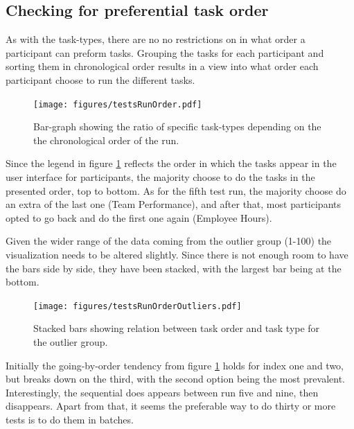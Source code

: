 \documentclass[nofilelist,dvipsnames]{cslthse-msc}
\begin{document}
{      \subsection{Checking for preferential task order}

        As with the task-types, there are no no restrictions on in what order a
        participant can preform tasks. Grouping the tasks for each participant
        and sorting them in chronological order results in a view into what
        order each participant choose to run the different tasks.

				\begin{figure}[ht!]
					\centering
					\texttt{[image: figures/testsRunOrder.pdf]}
          \caption{
            Bar-graph showing the ratio of specific task-types depending on the
            the chronological order of the run.
          }
          \label{label_testsRunOrder}
        \end{figure}

        Since the legend in figure \ref{label_testsRunOrder} reflects the order
        in which the tasks appear in the user interface for participants, the
        majority choose to do the tasks in the presented order, top to bottom.
        As for the fifth test run, the majority choose do an extra of the last
        one (Team Performance), and after that, most participants opted to go
        back and do the first one again (Employee Hours).

        Given the wider range of the data coming from the outlier group (1-100)
        the visualization needs to be altered slightly. Since there is not
        enough room to have the bars side by side, they have been stacked, with
        the largest bar being at the bottom.
				\begin{figure}[ht!]
					\centering
					\texttt{[image: figures/testsRunOrderOutliers.pdf]}
          \caption{
            Stacked bars showing relation between task order and task type for
            the outlier group.
          }
				\end{figure}

        Initially the going-by-order tendency from figure
        \ref{label_testsRunOrder} holds for index one and two, but breaks down
        on the third, with the second option being the most prevalent.
        Interestingly, the sequential does appears between run five and nine,
        then disappears. Apart from that, it seems the preferable way to do
        thirty or more tests is to do them in batches.

}
\end{document}
